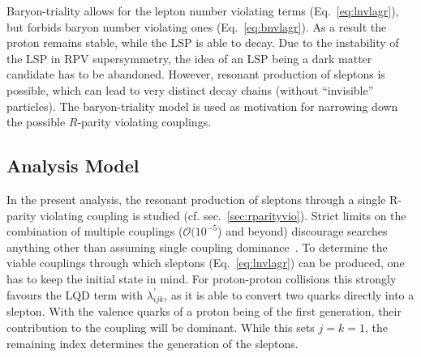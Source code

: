 Baryon-triality allows for the lepton number violating terms (Eq.~\ref{eq:lnvlagr}), but forbids baryon number violating ones (Eq.~\ref{eq:bnvlagr}). As a result the proton remains stable, while the LSP is able to decay. Due to the instability of the LSP in RPV supersymmetry, the idea of an LSP being a dark matter candidate has to be abandoned. However, resonant production of sleptons is possible, which can lead to very distinct decay chains (without ``invisible'' particles). The baryon-triality model is used as motivation for narrowing down the possible $R$-parity violating couplings.


\subsection{Analysis Model}
\label{sec:anamodel}

In the present analysis, the resonant production of sleptons through a single R-parity violating coupling is studied (cf. sec.~\ref{sec:rparityvio}). Strict limits on the combination of multiple couplings ($\mathcal{O}(10^{-5}$) and beyond) discourage searches anything other than assuming single coupling dominance~\cite{rpvimpl}. To determine the viable couplings through which sleptons (Eq.~\ref{eq:lnvlagr}) can be produced, one has to keep the initial state in mind. For proton-proton collisions this strongly favours the LQD term with $\lambda^\prime_{ijk}$, as it is able to convert two quarks directly into a slepton. With the valence quarks of a proton being of the first generation, their contribution to the coupling will be dominant. While this sets $j = k = 1$, the remaining index determines the generation of the sleptons. 


